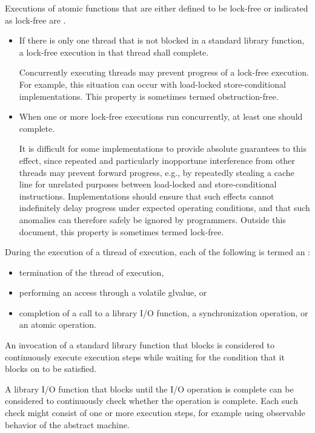 \pnum
Executions of atomic functions
that are either defined to be lock-free
or indicated as lock-free
are .
\begin{itemize}
\item
  If there is only one thread that is not blocked
  in a standard library function,
  a lock-free execution in that thread shall complete.
  \begin{note}
    Concurrently executing threads
    may prevent progress of a lock-free execution.
    For example,
    this situation can occur
    with load-locked store-conditional implementations.
    This property is sometimes termed obstruction-free.
  \end{note}
\item
  When one or more lock-free executions run concurrently,
  at least one should complete.
  \begin{note}
    It is difficult for some implementations
    to provide absolute guarantees to this effect,
    since repeated and particularly inopportune interference
    from other threads
    may prevent forward progress,
    e.g.,
    by repeatedly stealing a cache line
    for unrelated purposes
    between load-locked and store-conditional instructions.
    Implementations should ensure
    that such effects cannot indefinitely delay progress
    under expected operating conditions,
    and that such anomalies
    can therefore safely be ignored by programmers.
    Outside this document,
    this property is sometimes termed lock-free.
  \end{note}
\end{itemize}

\pnum
During the execution of a thread of execution, each of the following is termed
an :
\begin{itemize}
\item termination of the thread of execution,
\item performing an access through a volatile glvalue, or
\item completion of a call to a library I/O function, a
      synchronization operation, or an atomic operation.
\end{itemize}

\pnum
An invocation of a standard library function that blocks
is considered to continuously execute execution steps while waiting for the
condition that it blocks on to be satisfied.
\begin{example}
A library I/O function that blocks until the I/O operation is complete can
be considered to continuously check whether the operation is complete. Each
such check might consist of one or more execution steps, for example using
observable behavior of the abstract machine.
\end{example}

